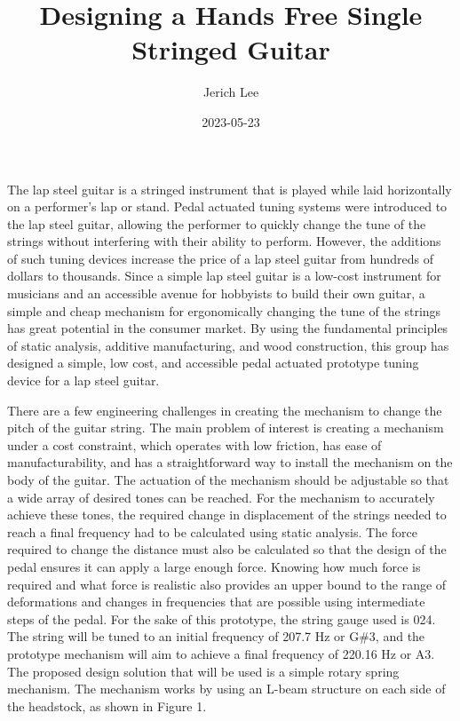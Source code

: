 \documentclass[12pt]{article}
\title{Designing a Hands Free Single Stringed Guitar}
\author{Jerich Lee}
\date{2023-05-23}
\theoremstyle{definition} %
\theoremstyle{plain} %
\begin{document}
\maketitle
The lap steel guitar is a stringed instrument that is played while laid horizontally on a
performer’s lap or stand. Pedal actuated tuning systems were introduced to the lap steel guitar,
allowing the performer to quickly change the tune of the strings without interfering with their ability
to perform. However, the additions of such tuning devices increase the price of a lap steel guitar
from hundreds of dollars to thousands. Since a simple lap steel guitar is a low-cost instrument for
musicians and an accessible avenue for hobbyists to build their own guitar, a simple and cheap
mechanism for ergonomically changing the tune of the strings has great potential in the consumer
market. By using the fundamental principles of static analysis, additive manufacturing, and wood
construction, this group has designed a simple, low cost, and accessible pedal actuated prototype
tuning device for a lap steel guitar.

There are a few engineering challenges in creating the mechanism to change the pitch of the
guitar string. The main problem of interest is creating a mechanism under a cost constraint, which
operates with low friction, has ease of manufacturability, and has a straightforward way to install the
mechanism on the body of the guitar. The actuation of the mechanism should be adjustable so that a
wide array of desired tones can be reached. For the mechanism to accurately achieve these tones, the
required change in displacement of the strings needed to reach a final frequency had to be calculated
using static analysis. The force required to change the distance must also be calculated so that the
design of the pedal ensures it can apply a large enough force. Knowing how much force is required
and what force is realistic also provides an upper bound to the range of deformations and changes in
frequencies that are possible using intermediate steps of the pedal. For the sake of this prototype,
the string gauge used is 024. The string will be tuned to an initial frequency of 207.7 Hz or G\#3, and
the prototype mechanism will aim to achieve a final frequency of 220.16 Hz or A3.
The proposed design solution that will be used is a simple rotary spring mechanism. The
mechanism works by using an L-beam structure on each side of the headstock, as shown in Figure 1.
\end{document}
